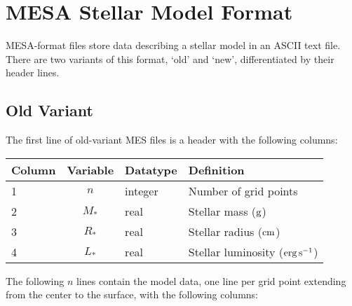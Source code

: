 \documentclass{article}
\newcommand{\Rstar}{\ensuremath{R_{\ast}}}
\newcommand{\Mstar}{\ensuremath{M_{\ast}}}
\newcommand{\Lstar}{\ensuremath{L_{\ast}}}
\newcommand{\cm}{\ensuremath{{\rm cm}}}
\newcommand{\gram}{\ensuremath{{\rm g}}}
\newcommand{\second}{\ensuremath{{\rm s}}}
\newcommand{\erg}{\ensuremath{{\rm erg}}}
\begin{document}
\section*{MESA Stellar Model Format}

MESA-format files store data describing a stellar model in an ASCII
text file. There are two variants of this format, `old' and `new',
differentiated by their header lines.

\subsection*{Old Variant}

The first line of old-variant MES files is a header with the following
columns:

\begin{table}[h!]
\begin{tabular}{|l|c|l|l|} \hline
Column & Variable & Datatype & Definition \\ \hline
1      & $n$ & integer & Number of grid points \\
2      & \Mstar & real & Stellar mass ($\gram$) \\
3      & \Rstar & real & Stellar radius ($\cm$) \\
4      & \Lstar & real & Stellar luminosity ($\erg\,\second^{-1}$) \\ \hline
\end{tabular}
\end{table}

The following $n$ lines contain the model data, one line per
grid point extending from the center to the surface, with the following columns:
\end{document}
